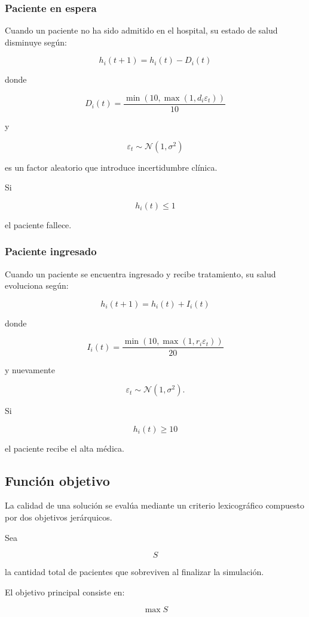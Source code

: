 \documentclass[12pt,a4paper]{article}
\begin{document}
\subsubsection{Paciente en espera}

Cuando un paciente no ha sido admitido en el hospital, su estado de salud disminuye según:

\[
h_i(t+1)
=
h_i(t)
-
D_i(t)
\]

donde

\[
D_i(t)
=
\frac{
\min(10,\max(1,d_i \varepsilon_t))
}{10}
\]

y

\[
\varepsilon_t
\sim
\mathcal{N}(1,\sigma^2)
\]

es un factor aleatorio que introduce incertidumbre clínica.

Si

\[
h_i(t)\le 1
\]

el paciente fallece.

\subsubsection{Paciente ingresado}

Cuando un paciente se encuentra ingresado y recibe tratamiento, su salud evoluciona según:

\[
h_i(t+1)
=
h_i(t)
+
I_i(t)
\]

donde

\[
I_i(t)
=
\frac{
\min(10,\max(1,r_i \varepsilon_t))
}{20}
\]

y nuevamente

\[
\varepsilon_t
\sim
\mathcal{N}(1,\sigma^2).
\]

Si

\[
h_i(t)\ge 10
\]

el paciente recibe el alta médica.

\subsection{Función objetivo}

La calidad de una solución se evalúa mediante un criterio lexicográfico compuesto por dos objetivos jerárquicos.

Sea

\[
S
\]

la cantidad total de pacientes que sobreviven al finalizar la simulación.

El objetivo principal consiste en:

\[
\max S
\]
\end{document}
